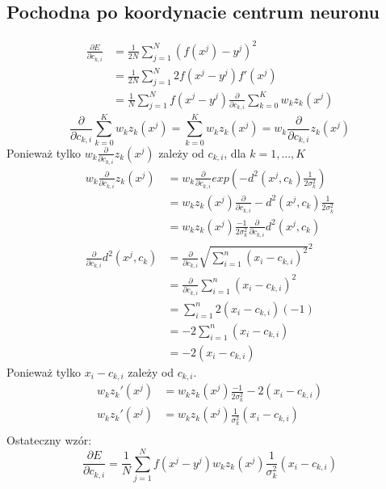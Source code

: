 \documentclass[a4paper, portrait,11pt]{article}
\begin{document}
\subsection{Pochodna po koordynacie centrum neuronu}
\begin{align}
  \frac{\partial E}{\partial{c_{k,i}}} &= \frac{1}{2N} \sum_{j=1}^{N} (f(x^j) - y^j)^2\\
  &= \frac{1}{2N} \sum_{j=1}^{N} 2 f(x^j - y^j) f'(x^j)\\
  &= \frac{1}{N} \sum_{j=1}^{N} f(x^j - y^j) \frac{\partial}{\partial{c_{k,i}}} \sum_{k=0}^{K} w_k z_k(x^j)
\end{align}
\begin{equation}
  \frac{\partial}{\partial{c_{k,i}}} \sum_{k=0}^{K} w_k z_k(x^j) = \sum_{k=0}^{K} w_k z_k(x^j) =  w_k \frac{\partial}{\partial{c_{k,i}}}z_k(x^j)
\end{equation}
Ponieważ tylko $w_k \frac{\partial}{\partial{c_{k,i}}}z_k(x^j)$ zależy od $c_{k,i}$, dla $k=1, ..., K$
\begin{align}
  w_k \frac{\partial}{\partial{c_{k,i}}}z_k(x^j) &= w_k \frac{\partial}{\partial{c_{k,i}}} exp(-d^2(x^j, c_k) \frac{1}{2\sigma_k^2})\\
    &= w_k z_k(x^j) \frac{\partial}{\partial{c_{k,i}}} -d^2(x^j, c_k) \frac{1}{2\sigma_k^2}\\
    &= w_k z_k(x^j) \frac{-1}{2\sigma_k^2} \frac{\partial}{\partial{c_{k,i}}} d^2(x^j, c_k) \\
  \frac{\partial}{\partial{c_{k,i}}} d^2(x^j, c_k) &= \frac{\partial}{\partial{c_{k,i}}} \sqrt{\sum_{i = 1}^{n} (x_i - c_{k,i})^2}^2\\
  &= \frac{\partial}{\partial{c_{k,i}}} \sum_{i = 1}^{n} (x_i - c_{k,i})^2\\
  &= \sum_{i = 1}^{n} 2 (x_i - c_{k,i}) (-1)\\
  &= -2 \sum_{i = 1}^{n} (x_i - c_{k,i})\\
  &= -2 (x_i - c_{k,i})
\end{align}
Ponieważ tylko $x_i - c_{k,i}$ zależy od $c_{k,i}$.
\begin{align}
  w_k z_k'(x^j) &= w_k z_k(x^j) \frac{-1}{2\sigma_k^2} -2 (x_i - c_{k,i})\\
  w_k z_k'(x^j) &= w_k z_k(x^j) \frac{1}{\sigma_k^2} (x_i - c_{k,i})\\
\end{align}
Ostateczny wzór:
\begin{equation}
\frac{\partial E}{\partial{c_{k,i}}} = \frac{1}{N} \sum_{j=1}^{N} f(x^j - y^j) w_k z_k(x^j) \frac{1}{\sigma_k^2} (x_i - c_{k,i})
\end{equation}
\end{document}
